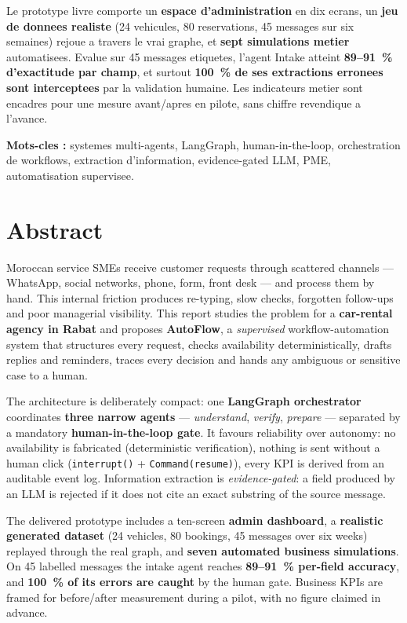 \documentclass[12pt,a4paper,openany]{report}
\begin{document}
Le prototype livre comporte un \textbf{espace d'administration} en dix ecrans, un \textbf{jeu de donnees realiste} (24 vehicules, 80 reservations, 45 messages sur six semaines) rejoue a travers le vrai graphe, et \textbf{sept simulations metier} automatisees. Evalue sur 45 messages etiquetes, l'agent Intake atteint \textbf{89--91~\% d'exactitude par champ}, et surtout \textbf{100~\% de ses extractions erronees sont interceptees} par la validation humaine. Les indicateurs metier sont encadres pour une mesure avant/apres en pilote, sans chiffre revendique a l'avance.

\noindent\textbf{Mots-cles :} systemes multi-agents, LangGraph, human-in-the-loop, orchestration de workflows, extraction d'information, evidence-gated LLM, PME, automatisation supervisee.

\chapter*{Abstract}

Moroccan service SMEs receive customer requests through scattered channels --- WhatsApp, social networks, phone, form, front desk --- and process them by hand. This internal friction produces re-typing, slow checks, forgotten follow-ups and poor managerial visibility. This report studies the problem for a \textbf{car-rental agency in Rabat} and proposes \textbf{AutoFlow}, a \emph{supervised} workflow-automation system that structures every request, checks availability deterministically, drafts replies and reminders, traces every decision and hands any ambiguous or sensitive case to a human.

The architecture is deliberately compact: one \textbf{LangGraph orchestrator} coordinates \textbf{three narrow agents} --- \emph{understand}, \emph{verify}, \emph{prepare} --- separated by a mandatory \textbf{human-in-the-loop gate}. It favours reliability over autonomy: no availability is fabricated (deterministic verification), nothing is sent without a human click (\texttt{interrupt()} + \texttt{Command(resume)}), every KPI is derived from an auditable event log. Information extraction is \emph{evidence-gated}: a field produced by an LLM is rejected if it does not cite an exact substring of the source message.

The delivered prototype includes a ten-screen \textbf{admin dashboard}, a \textbf{realistic generated dataset} (24 vehicles, 80 bookings, 45 messages over six weeks) replayed through the real graph, and \textbf{seven automated business simulations}. On 45 labelled messages the intake agent reaches \textbf{89--91~\% per-field accuracy}, and \textbf{100~\% of its errors are caught} by the human gate. Business KPIs are framed for before/after measurement during a pilot, with no figure claimed in advance.
\end{document}
